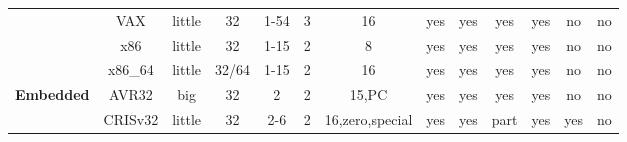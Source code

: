 \begin{sidewaystable}[tbp]
\begin{sf}
\begin{footnotesize}
\begin{center}
\begin{tabular}{|c|c||c|c|c|c|c|c|c|c|c|c|c|}
                 & %
VAX              & %
little           & %
32               & %
1-54             & %
3                & %
16               & %
yes              & %
yes              & %
yes              & %
yes              & %
no               & %
no                 %
\\
\cline{2-13}

                 & %
x86              & %
little           & %
32               & %
1-15             & %
2                & %
8                & %
yes              & %
yes              & %
yes              & %
yes              & %
no               & %
no                 %
\\
\cline{2-13}

		 & %
x86\_64          & %
little           & %
32/64            & %
1-15             & %
2                & %
16               & %
yes              & %
yes              & %
yes              & %
yes              & %
no               & %
no                 %
\\

\hline\hline


\multirow{5}{*}{\bf Embedded} &
AVR32            & %
big              & %
32               & %
2                & %
2                & %
15,PC            & %
yes              & %
yes              & %
yes              & %
yes              & %
no               & %
no                 %
\\
\cline{2-13}

                 & %
CRISv32          & %
little           & %
32               & %
2-6              & %
2                & %
16,zero,special  & %
yes              & %
yes              & %
part             & %
yes              & %
yes              & %
no                 %
\\
\cline{2-13}


\end{tabular}
\end{center}
\end{footnotesize}
\end{sf}
\end{sidewaystable}
